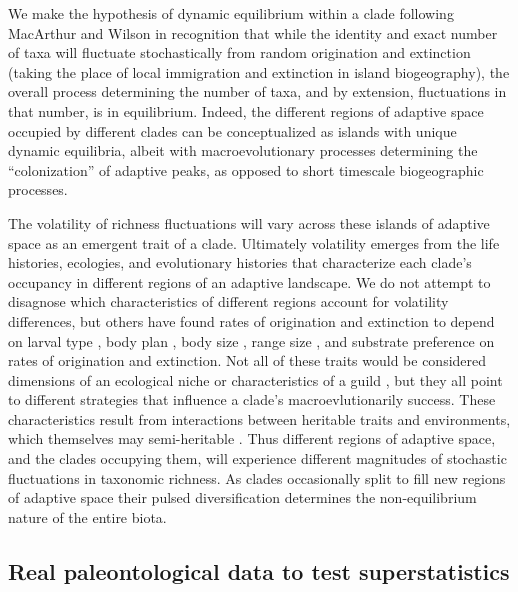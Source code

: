 \documentclass[12pt]{article}
\let\citep=\cite
\begin{document}
We make the hypothesis of dynamic equilibrium within a clade following
MacArthur and Wilson \citep{macWilson} in recognition that while the
identity and exact number of taxa will fluctuate stochastically from
random origination and extinction (taking the place of local
immigration and extinction in island biogeography), the overall
process determining the number of taxa, and by extension, fluctuations
in that number, is in equilibrium. Indeed, the different regions of
adaptive space occupied by different clades can be conceptualized as
islands with unique dynamic equilibria, albeit with macroevolutionary
processes determining the ``colonization'' of adaptive peaks, as
opposed to short timescale biogeographic processes.

The volatility of richness fluctuations will vary across these islands
of adaptive space as an emergent trait of a clade. Ultimately
volatility emerges from the life histories, ecologies, and
evolutionary histories that characterize each clade's occupancy in
different regions of an adaptive landscape. We do not attempt to
disagnose which characteristics of different regions account for
volatility differences, but others have found rates of origination and
extinction to depend on larval type \citep{jablonski2008}, body plan
\citep{erwin2012}, body size \citep{harnik2011}, range size
\citep{harnik2011, foote2008paleobiol}, and substrate preference
\citep{hopkins2014} on rates of origination and extinction. Not all of
these traits would be considered dimensions of an ecological niche or
characteristics of a guild \citep{bambach}, but they all point to
different strategies that influence a clade's macroevlutionarily
success. These characteristics result from interactions between
heritable traits and environments, which themselves may semi-heritable
\citep{nicheCons}. Thus different regions of adaptive space, and the
clades occupying them, will experience different magnitudes of
stochastic fluctuations in taxonomic richness. As clades occasionally
split to fill new regions of adaptive space their pulsed
diversification determines the non-equilibrium nature of the entire
biota.




\subsection{Real paleontological data to test superstatistics}
\end{document}
